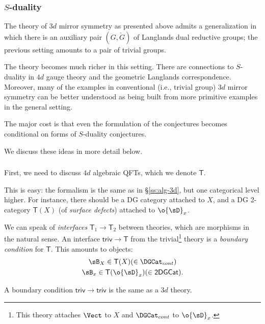 \subsubsection{$S$-duality}\label{sss:s}

The theory of $3d$ mirror symmetry as presented above admits a generalization
in which there is an auxiliary pair $(G,\check{G})$ of Langlands dual
reductive groups; the previous setting amounts to a pair of trivial groups.

The theory becomes much richer in this setting. There are connections
to $S$-duality in $4d$ gauge theory and the geometric Langlands correspondence.
Moreover, many of the examples in conventional (i.e., trivial group) $3d$ mirror
symmetry can be better understood as being built from more primitive
examples in the general setting.

The major cost is that even the formulation of the conjectures
becomes conditional on forms of $S$-duality conjectures.

We discuss these ideas in more detail below.

\subsubsection{}

First, we need to discuss $4d$ algebraic QFTs, which we denote $\mathsf{T}$.

This is easy: the formalism is the same as in \S \ref{ss:alg-3d},
but one categorical level higher. For instance, there should
be a DG category attached to $X$, and a DG 2-category $\mathsf{T}(X)$
(of \emph{surface defects}) attached to
$\o{\sD}_x$.

We can speak of \emph{interfaces} $\mathsf{T}_1 \to \mathsf{T}_2$ between
theories, which are morphisms in the natural sense. An interface
$\mathsf{triv} \to \mathsf{T}$ from
the trivial\footnote{This theory attaches $\Vect$ to $X$ and
$\DGCat_{cont}$ to $\o{\sD}_x$.}
theory is a \emph{boundary condition} for $\mathsf{T}$.
This amounts to objects:
%
\[
\begin{gathered}
\sB_X \in \mathsf{T}(X) (\in \DGCat_{cont})  \\
\sB_x \in \mathsf{T}(\o{\sD}_x) (\in \mathsf{2DGCat}).
\end{gathered}
\]

\begin{rem}
\notready\label{r:3d-as-bdry}

A boundary condition $\mathsf{triv} \to \mathsf{triv}$ is the same
as a $3d$ theory.

\end{rem}

